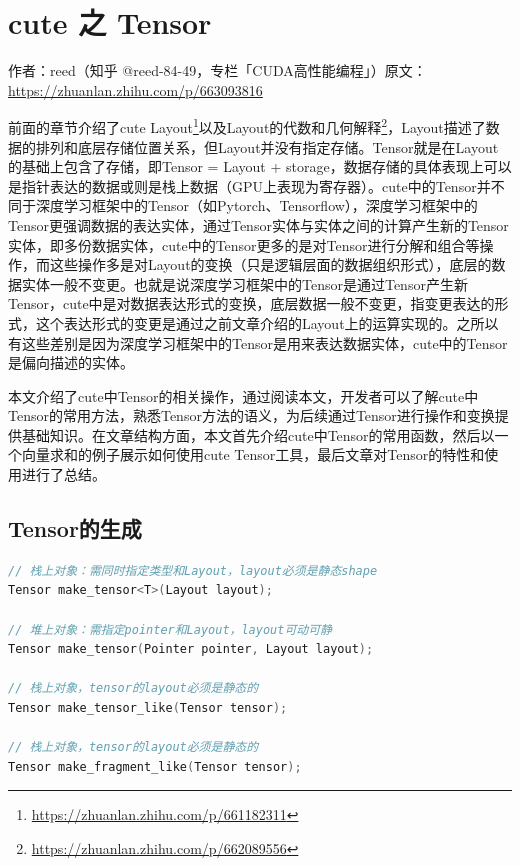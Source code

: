 \chapter{cute 之 Tensor}

\begin{center}\small 作者：reed（知乎 @reed-84-49，专栏「CUDA高性能编程」）\quad 原文：\url{https://zhuanlan.zhihu.com/p/663093816}\end{center}

前面的章节介绍了cute Layout\footnote{\url{https://zhuanlan.zhihu.com/p/661182311}}以及Layout的代数和几何解释\footnote{\url{https://zhuanlan.zhihu.com/p/662089556}}，Layout描述了数据的排列和底层存储位置关系，但Layout并没有指定存储。Tensor就是在Layout的基础上包含了存储，即Tensor = Layout + storage，数据存储的具体表现上可以是指针表达的数据或则是栈上数据（GPU上表现为寄存器）。cute中的Tensor并不同于深度学习框架中的Tensor（如Pytorch、Tensorflow），深度学习框架中的Tensor更强调数据的表达实体，通过Tensor实体与实体之间的计算产生新的Tensor实体，即多份数据实体，cute中的Tensor更多的是对Tensor进行分解和组合等操作，而这些操作多是对Layout的变换（只是逻辑层面的数据组织形式），底层的数据实体一般不变更。也就是说深度学习框架中的Tensor是通过Tensor产生新Tensor，cute中是对数据表达形式的变换，底层数据一般不变更，指变更表达的形式，这个表达形式的变更是通过之前文章介绍的Layout上的运算实现的。之所以有这些差别是因为深度学习框架中的Tensor是用来表达数据实体，cute中的Tensor是偏向描述的实体。

本文介绍了cute中Tensor的相关操作，通过阅读本文，开发者可以了解cute中Tensor的常用方法，熟悉Tensor方法的语义，为后续通过Tensor进行操作和变换提供基础知识。在文章结构方面，本文首先介绍cute中Tensor的常用函数，然后以一个向量求和的例子展示如何使用cute Tensor工具，最后文章对Tensor的特性和使用进行了总结。

\section{Tensor的生成}

\begin{lstlisting}[language=C++]
// 栈上对象：需同时指定类型和Layout，layout必须是静态shape
Tensor make_tensor<T>(Layout layout);

// 堆上对象：需指定pointer和Layout，layout可动可静
Tensor make_tensor(Pointer pointer, Layout layout);

// 栈上对象，tensor的layout必须是静态的
Tensor make_tensor_like(Tensor tensor);

// 栈上对象，tensor的layout必须是静态的
Tensor make_fragment_like(Tensor tensor);
\end{lstlisting}

